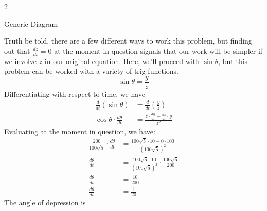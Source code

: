 \documentclass{article}
\begin{document}
\begin{enumerate}
\begin{enumerate}
\begin{solution}
\begin{multicols}{2}
\begin{tikzpicture}
    \end{tikzpicture}

Generic Diagram\\
    \end{multicols}
    
    Truth be told, there are a few different ways to work this problem, but finding out that $\frac{dz}{dt}=0$ at the moment in question signals that our work will be simpler if we involve $z$ in our original equation. Here, we'll proceed with $\sin\theta$, but this problem can be worked with a variety of trig functions.\\
    $$\sin \theta = \frac{y}{z}$$
    Differentiating with respect to time, we have 
    \begin{align*}
        \frac{d}{dt}(\sin \theta) &= \frac{d}{dt}\left(\frac{y}{z}\right)\\
        \cos \theta \cdot \frac{d\theta}{dt} &= \frac{z\cdot \frac{dy}{dt}-\frac{dz}{dt}\cdot y}{z^2}
    \end{align*}
    Evaluating at the moment in question, we have:
    \begin{align*}
       \frac{200}{100\sqrt{5}} \cdot \frac{d\theta}{dt} &= \frac{100\sqrt{5}\cdot 10-0 \cdot 100}{(100\sqrt{5})^2}\\
       \frac{d\theta}{dt} &= \frac{100\sqrt{5}\cdot 10}{(100\sqrt{5})^2}\cdot \frac{100\sqrt{5}}{200}\\
       \frac{d\theta}{dt} &= \frac{10}{200}\\
       \frac{d\theta}{dt} &= \frac{1}{20}
    \end{align*}
    The angle of depression is 
\end{solution}
  \end{enumerate}


\end{enumerate}
\end{document}
